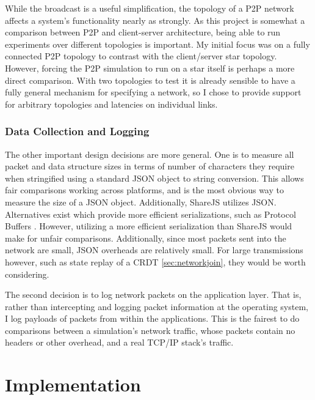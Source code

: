 \documentclass[12pt,a4paper,twoside,openright]{report}
\begin{document}
	While the broadcast is a useful simplification, the topology of a P2P network affects a system's functionality nearly as strongly. As this project is somewhat a comparison between P2P and client-server architecture, being able to run experiments over different topologies is important. My initial focus was on a fully connected P2P topology to contrast with the client/server star topology. However, forcing the P2P simulation to run on a star itself is perhaps a more direct comparison. With two topologies to test it is already sensible to have a fully general mechanism for specifying a network, so I chose to provide support for arbitrary topologies and latencies on individual links. 
	

	\subsection{Data Collection and Logging} \label{sec:datacollectiondecisions}
	
	
	The other important design decisions are more general. One is to measure all packet and data structure sizes in terms of number of characters they require when stringified using a standard JSON object to string conversion. This allows fair comparisons working across platforms, and is the most obvious way to measure the size of a JSON object. Additionally, ShareJS utilizes JSON. Alternatives exist which provide more efficient serializations, such as Protocol Buffers \cite{protobuf}. However, utilizing a more efficient serialization than ShareJS would make for unfair comparisons. Additionally, since most packets sent into the network are small, JSON overheads are relatively small. For large transmissions however, such as state replay of a CRDT \cref{sec:networkjoin}, they would be worth considering.
	
	The second decision is to log network packets on the application layer. That is, rather than intercepting and logging packet information at the operating system, I log payloads of packets from within the applications. This is the fairest to do comparisons between a simulation's network traffic, whose packets contain no headers or other overhead, and a real TCP/IP stack's traffic.



\chapter{Implementation} \label{sec:implementation}
\end{document}
